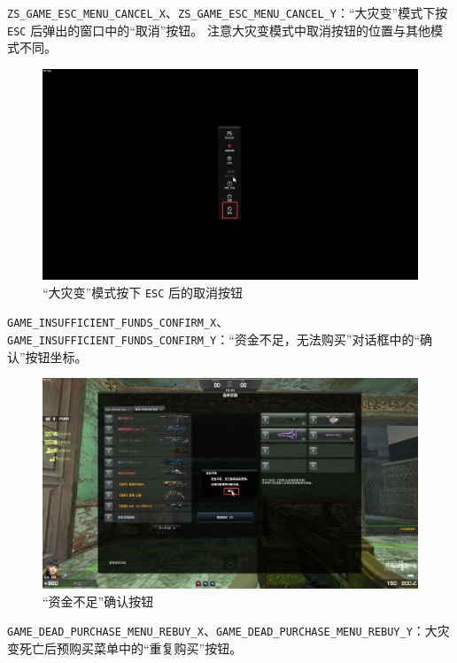 \lstinline{ZS_GAME_ESC_MENU_CANCEL_X}、\lstinline{ZS_GAME_ESC_MENU_CANCEL_Y}：“大灾变”模式下按 \lstinline{ESC} 后弹出的窗口中的“取消”按钮。
注意大灾变模式中取消按钮的位置与其他模式不同。

\begin{figure}[H]
    \Centering
    \includegraphics[width=\textwidth]{docs/assets/zs_esc_cancel.png}
    \caption{“大灾变”模式按下 \lstinline{ESC} 后的取消按钮}
\end{figure}

\lstinline{GAME_INSUFFICIENT_FUNDS_CONFIRM_X}、\lstinline{GAME_INSUFFICIENT_FUNDS_CONFIRM_Y}：“资金不足，无法购买”对话框中的“确认”按钮坐标。

\begin{figure}[H]
    \Centering
    \includegraphics[width=\textwidth]{docs/assets/game_insuff_funds_confirm.png}
    \caption{“资金不足”确认按钮}
\end{figure}

\lstinline{GAME_DEAD_PURCHASE_MENU_REBUY_X}、\lstinline{GAME_DEAD_PURCHASE_MENU_REBUY_Y}：大灾变死亡后预购买菜单中的“重复购买”按钮。

